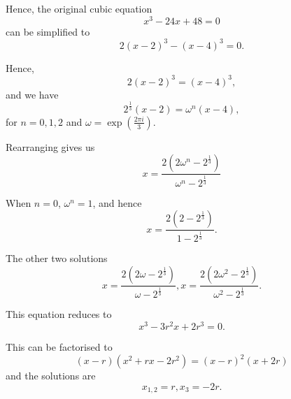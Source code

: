 Hence, the original cubic equation
\[
    x^3 - 24x + 48 = 0
\]
can be simplified to
\[
    2 (x - 2) ^ 3 - (x - 4)^3 = 0.
\]

Hence,
\[
    2(x - 2)^3 = (x - 4)^3,
\]
and we have
\[
    2^{\frac{1}{3}} (x - 2) = \omega^n (x - 4),
\]
for \(n = 0, 1, 2\) and \(\omega = \exp \left(\frac{2\pi i}{3}\right)\).

Rearranging gives us
\[
    x = \frac{2 \left(2\omega^n - 2^\frac{1}{3}\right)}{\omega^n - 2^{\frac{1}{3}}}
\]

When \(n = 0\), \(\omega^n = 1\), and hence
\[
    x = \frac{2 \left(2 - 2^{\frac{1}{3}}\right)}{1 - 2^{\frac{1}{3}}}.
\]

The other two solutions
\[
    x = \frac{2 \left(2 \omega - 2^{\frac{1}{3}}\right)}{\omega - 2^{\frac{1}{3}}}, x = \frac{2 \left(2 \omega^2 - 2^{\frac{1}{3}}\right)}{\omega^2 - 2^{\frac{1}{3}}}.
\]

This equation reduces to
\[
    x^3 - 3r^2 x + 2 r^3 = 0.
\]

This can be factorised to
\[
    (x - r)(x^2 + rx - 2r^2) = (x - r)^2 (x + 2r)
\]
and the solutions are
\[
    x_{1, 2} = r, x_3 = -2r.
\]